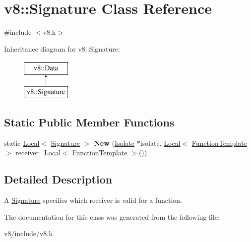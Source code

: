 \hypertarget{classv8_1_1Signature}{}\section{v8\+:\+:Signature Class Reference}
\label{classv8_1_1Signature}


{\ttfamily \#include $<$v8.\+h$>$}

Inheritance diagram for v8\+:\+:Signature\+:\begin{figure}[H]
\begin{center}
\leavevmode
\includegraphics[height=2.000000cm]{classv8_1_1Signature}
\end{center}
\end{figure}
\subsection*{Static Public Member Functions}
\begin{DoxyCompactItemize}
\item 
\hypertarget{classv8_1_1Signature_a4e3d622674ec1f735e9981ec3309320f}{}static \hyperlink{classv8_1_1Local}{Local}$<$ \hyperlink{classv8_1_1Signature}{Signature} $>$ {\bfseries New} (\hyperlink{classv8_1_1Isolate}{Isolate} $\ast$isolate, \hyperlink{classv8_1_1Local}{Local}$<$ \hyperlink{classv8_1_1FunctionTemplate}{Function\+Template} $>$ receiver=\hyperlink{classv8_1_1Local}{Local}$<$ \hyperlink{classv8_1_1FunctionTemplate}{Function\+Template} $>$())\label{classv8_1_1Signature_a4e3d622674ec1f735e9981ec3309320f}

\end{DoxyCompactItemize}


\subsection{Detailed Description}
A \hyperlink{classv8_1_1Signature}{Signature} specifies which receiver is valid for a function. 

The documentation for this class was generated from the following file\+:\begin{DoxyCompactItemize}
\item 
v8/include/v8.\+h\end{DoxyCompactItemize}
